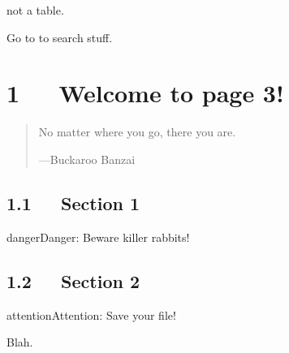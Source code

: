 \documentclass[letterpaper,10pt,english]{sphinxmanual}
\begin{document}
not a table.


Go to  to search stuff.


\chapter{1   Welcome to page 3!}
\label{\detokenize{page3::doc}}\label{\detokenize{page3:welcome-to-page-3}}\begin{quote}

No matter where you go, there you are.

\begin{flushright}
---Buckaroo Banzai
\end{flushright}
\end{quote}


\section{1.1   Section 1}
\label{\detokenize{page3:section-1}}
\begin{sphinxVerbatim}[commandchars=\\\{\}]
 
     
\end{sphinxVerbatim}

\begin{sphinxadmonition}{danger}{Danger:}
Beware killer rabbits!
\end{sphinxadmonition}

\begin{sphinxVerbatim}[commandchars=\\\{\}]
  
\end{sphinxVerbatim}


\section{1.2   Section 2}
\label{\detokenize{page3:section-2}}
\begin{sphinxadmonition}{attention}{Attention:}
Save your file!
\end{sphinxadmonition}

\begin{sphinxShadowBox}

Blah.
\end{sphinxShadowBox}
\end{document}
